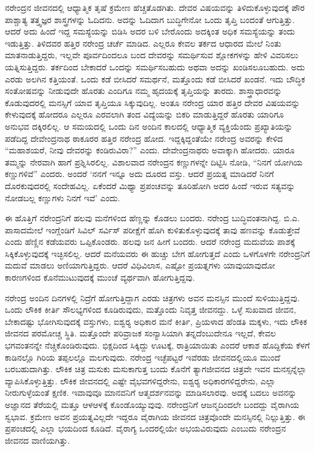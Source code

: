ನರೇಂದ್ರನ ಜೀವನದಲ್ಲಿ ಆಧ್ಯಾತ್ಮಿಕ ತೃಷೆ ಕ್ರಮೇಣ ಹೆಚ್ಚತೊಡಗಿತು. ದೇವರ ವಿಷಯವನ್ನು ತಿಳಿದುಕೊಳ್ಳುವುದಕ್ಕೆ ಪೌರ ಪಾಶ್ಚಾತ್ಯ ತತ್ತ್ವಜ್ಞರ ಶಾಸ್ತ್ರಗಳನ್ನು ಓದಿದನು. ಅದನ್ನು ಓದಿದಾಗ ಬುದ್ಧಿಗೇನೋ ಒಂದು ತೃಪ್ತಿ ಬಂದಂತೆ ಆಗುತ್ತಿತ್ತು. ಆದರೆ ಅದು ಹಿಂದೆ ಇದ್ದ ಸಮಸ್ಯೆಯನ್ನು ಬಿಡಿಸಿ ಅದರ ಬಳಿ ಬೇರೊಂದು ಅದಕ್ಕಿಂತ ಅಧಿಕ ಸಮಸ್ಯೆಯನ್ನು ತಂದು ಇಡುತ್ತಿತ್ತು. ತಿಳಿದವರ ಹತ್ತಿರ ನರೇಂದ್ರ ಚರ್ಚೆ ಮಾಡಿದ. ಎಲ್ಲರೂ ಕೇವಲ ತರ್ಕದ ಆಧಾರದ ಮೇಲೆ ನಿಂತು ಮಾತನಾಡುತ್ತಿದ್ದರು, ಇಲ್ಲವೇ ಪೂರ್ವದಿಂದಲೂ ಬಂದ ದೇವರನ್ನು ಸಮರ್ಥಿಸುವ ಶ್ಲೋಕಗಳನ್ನು ಹೇಳಿ ವಿವರಿಸಲು ಯತ್ನಿಸುತ್ತಿದ್ದರು. ತರ್ಕದಿಂದ ಬೇಕಾದರೆ ಒಂದನ್ನು ಸಮರ್ಥಿಸಬಹುದು ಅಥವಾ ಅದನ್ನು ಖಂಡಿಸಲೂಬಹುದು. ಅದು ಎರಡು ಅಲಗಿನ ಕತ್ತಿಯಂತೆ. ಒಂದು ಕಡೆ ಬೀಸಿದರೆ ಸಮರ್ಥನೆ, ಮತ್ತೊಂದು ಕಡೆ ಬೀಸಿದರೆ ಖಂಡನೆ. ಇದು ಬೌದ್ಧಿಕ ಸಂತೋಷವನ್ನು ನೀಡುವುದೇ ಹೊರತು ಎಂದಿಗೂ ನಮ್ಮ ಹೃದಯಕ್ಕೆ ತೃಪ್ತಿಯನ್ನು ತಾರದು. ಶಾಸ್ತ್ರಾಧಾರವನ್ನು ಕೊಡುವುದರಲ್ಲಿ ಮನಸ್ಸಿಗೆ ಯಾವ ತೃಪ್ತಿಯೂ ಸಿಕ್ಕುವುದಿಲ್ಲ. ಅಂತೂ ನರೇಂದ್ರ ಯಾರ ಹತ್ತಿರ ದೇವರ ವಿಷಯವನ್ನು ಕೇಳುವುದಕ್ಕೆ ಹೋದರೂ ಎಲ್ಲರೂ ಎರವಲಾಗಿ ತಂದ ವಿದ್ಯೆಯನ್ನು ಬಿಕರಿ ಮಾಡುತ್ತಿದ್ದರೆ ಹೊರತು ಯಾರಿಗೂ ಅನುಭವ ದಕ್ಕಿರಲಿಲ್ಲ. ಆ ಸಮಯದಲ್ಲಿ ಒಂದು ದಿನ ಅಂದಿನ ಕಾಲದಲ್ಲಿ ಆಧ್ಯಾತ್ಮಿಕ ವ್ಯಕ್ತಿಯೆಂದು ಪ್ರಖ್ಯಾತಿಯನ್ನು ಪಡೆದಿದ್ದ ದೇವೇಂದ್ರನಾಥ ಠಾಕೂರರ ಹತ್ತಿರ ನರೇಂದ್ರ ಹೋದ. ಇದ್ದಕ್ಕಿದ್ದಂತೆಯೇ ನರೇಂದ್ರ ಅವರನ್ನು ಕೇಳಿದ “ಮಹಾಶಯರೆ, ನೀವು ದೇವರನ್ನು ಕಂಡಿರುವಿರಾ?” ಎಂದು. ದೇವೇಂದ್ರನಾಥರು ಅವಾಕ್ಕಾಗಿ ಹೋದರು. ಯಾರೂ ತಮ್ಮನ್ನು ನೇರವಾಗಿ ಹಾಗೆ ಪ್ರಶ್ನಿಸಿರಲಿಲ್ಲ. ವಿಶಾಲವಾದ ನರೇಂದ್ರನ ಕಣ್ಣುಗಳನ್ನೇ ದಿಟ್ಟಿಸಿ ನೋಡಿ, “ನಿನಗೆ ಯೋಗಿಯ ಕಣ್ಣುಗಳಿವೆ” ಎಂದರು. ಅಂದರೆ ‘ನನಗೆ ಇನ್ನೂ ಅದು ದೂರದ ವಸ್ತು. ಆದರೆ ಪ್ರಯತ್ನ ಮಾಡಿದರೆ ನಿನಗೆ ದೊರಕುವುದರಲ್ಲಿ ಸಂದೇಹವಿಲ್ಲ. ಏಕೆಂದರೆ ಮಿಥ್ಯಾ ಪ್ರಪಂಚವನ್ನು ತೂರಿಹೋಗಿ ಅದರ ಹಿಂದೆ ಇರುವ ಸತ್ಯವನ್ನು ನೋಡಬಲ್ಲ ಕಣ್ಣುಗಳು ನಿನಗೆ ಇವೆ’ ಎಂದು.

ಈ ಹೊತ್ತಿಗೆ ನರೇಂದ್ರನಿಗೆ ಹಲವು ಮನೆಗಳಿಂದ ಹೆಣ್ಣನ್ನು ಕೊಡಲು ಬಂದರು. ನರೇಂದ್ರ ಬುದ್ಧಿವಂತನಾಗಿದ್ದ. ಬಿ.ಎ. ಪಾಸಾದಮೇಲೆ ಇಂಗ್ಲೆಂಡಿಗೆ ಸಿವಿಲ್ ಸರ್ವಿಸ್ ಪರೀಕ್ಷೆಗೆ ಹೊಗಿ ಕುಳಿತುಕೊಳ್ಳುವುದಕ್ಕೆ ತಾವು ಹಣವನ್ನು ಕೊಡುತ್ತೇವೆ ಎಂದು ಹೆಣ್ಣಿನ ಕಡೆಯವರು ಒಪ್ಪಿಕೊಂಡರು. ಹಲವು ಜನ ಹೀಗೆ ಬಂದರು. ಆದರೆ ನರೇಂದ್ರ ಮದುವೆಯ ಪಾಶಕ್ಕೆ ಸಿಕ್ಕಿಕೊಳ್ಳುವುದಕ್ಕೆ ಇಚ್ಛಿಸಲಿಲ್ಲ. ಆದರೆ ಮನೆಯವರು ಈ ಹುಚ್ಚು ಬೇಗ ಹೋಗುತ್ತದೆ ಎಂದು ಒಳಗೊಳಗೇ ನರೇಂದ್ರನಿಗೆ ಮದುವೆ ಮಾಡಲು ಅಣಿಯಾಗುತ್ತಿದ್ದರು. ಆದರೆ ವಿಧಿವಿಲಾಸ, ಎಷ್ಟೋ ಪ್ರಯತ್ನಗಳು ಯಾವುಯಾವುದೋ ಕಾರಣಗಳಿಂದ ಕೊನೆಮುಟುವುದಕ್ಕೆ ಮುಂಚೆ ವ್ಯರ್ಥವಾಗಿ ಹೋಗುತ್ತಿದ್ದವು.

ನರೇಂದ್ರ ಅಂದಿನ ದಿನಗಳಲ್ಲಿ ನಿದ್ರೆಗೆ ಹೋಗುತ್ತಿದ್ದಾಗ ಎರಡು ಚಿತ್ರಗಳು ಅವನ ಮನಸ್ಸಿನ ಮುಂದೆ ಸುಳಿಯುತ್ತಿದ್ದವು. ಒಂದು ಲೌಕಿಕ ಕೀರ್ತಿ ಸೌಲಭ್ಯಗಳಿಂದ ಕೂಡಿರುವುದು, ಮತ್ತೊಂದು ನಿವೃತ್ತ ಜೀವನದ್ದು. ಒಳ್ಳೆ ಸುಖವಾದ ಜೀವನ, ಬೇಕಾದಷ್ಟು ಭೋಗಿಸುವುದಕ್ಕೆ ವಸ್ತುಗಳು, ಐಶ್ವರ‍್ಯ ಅಧಿಕಾರ ಮನೆ ಕೀರ್ತಿ, ಪ್ರಿಯಳಾದ ಹೆಂಡತಿ ಮಕ್ಕಳು, ಇದು ಲೌಕಿಕ ಜೀವನದ ಪರಮೋಚ್ಚ ಸ್ಥಿತಿ. ಮತ್ತೊಂದೇ ಪರಿವ್ರಾಜಕ ಸಂನ್ಯಾಸಿಯಾಗಿ ತನ್ನದೆಂಬುದೇನೂ ಇಲ್ಲದೆ, ಕೇವಲ ಭಗವಂತನನ್ನೇ ನೆಚ್ಚಿಕೊಂಡಿರುವುದು. ಭಿಕ್ಷದಿಂದ ಸಿಕ್ಕಿದ್ದು ಊಟಕ್ಕೆ, ರಾತ್ರಿಯಾಯಿತು ಎಂದರೆ ಆಕಾಶ ಹೊದ್ದಿಕೆಯ ಕೆಳಗೆ ಕಾಡಿನಲ್ಲೊ ಗಿರಿಯ ತಪ್ಪಲಲ್ಲೊ ಮಲಗುವುದು. ನರೇಂದ್ರ ಇಚ್ಛೆಪಟ್ಟರೆ ಇವೆರಡು ಜೀವನದಲ್ಲಿಯೂ ಮುಂದೆ ಬರಬಹುದಾಗಿತ್ತು. ಲೌಕಿಕ ಚಿತ್ರ ಮಸುಕು ಮಸುಕಾಗುತ್ತ ಬಂದು ಕೊನೆಗೆ ತ್ಯಾಗಜೀವನದ ಚಿತ್ರವೇ ಇವನ ಮನಸ್ಸನ್ನೆಲ್ಲಾ ವ್ಯಾಪಿಸಿಕೊಳ್ಳುತ್ತಿತ್ತು. ಲೌಕಿಕ ಜೀವನದಲ್ಲಿ ಎಷ್ಟೇ ವೈಭವಗಳಿದ್ದರೇನು, ಐಶ್ವರ‍್ಯ ಅಧಿಕಾರಗಳಿದ್ದರೇನು, ಎಲ್ಲಾ ನೀರುಗುಳ್ಳೆಯಂತೆ ಕ್ಷಣಿಕ. ಇವಾವುವೂ ಮಾನವನಿಗೆ ಆತ್ಮದರ್ಶನವನ್ನು ಮಾಡಿಸಲಾರವು. ಅದಕ್ಕೆ ಬದಲು ಅವನನ್ನು ಅಜ್ಞಾನದ ತೆರೆಯಲ್ಲಿ ಮತ್ತೂ ಆಳಆಳಕ್ಕೆ ಕೊಂಡೊಯ್ಯುವುವು. ನರೇಂದ್ರನಿಗೆ ಆಜನ್ಮದಿಂದಲೇ ಬಂದದ್ದು ವೈರಾಗಿಯ ಸ್ವಭಾವ. ಕ್ರಮೇಣ ಅವನ ಪ್ರಯತ್ನವಿಲ್ಲದೇ ಇದ್ದರೂ ವೈರಾಗಿಯ ಜೀವನದ ಚಿತ್ರವೊಂದೇ ಮನಸ್ಸಿನಲ್ಲಿ ನಿಲ್ಲುತ್ತಿತ್ತು. ಈ ಪ್ರಪಂಚದಲ್ಲಿ ಎಲ್ಲಾ ಭಯದಿಂದ ಕೂಡಿದೆ. ವೈರಾಗ್ಯ ಒಂದರಲ್ಲಿಯೇ ಅಭಯವಿರುವುದು ಎಂಬುದು ನರೇಂದ್ರನ ಜೀವನದ ವಾಣಿಯಗಿತ್ತು.

